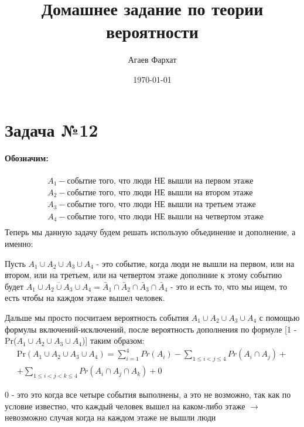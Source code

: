 \documentclass[a4paper, 12pt]{article} %
\author{Агаев Фархат}
\title{Домашнее задание по теории вероятности}
\date{\today}
\begin{document}

\maketitle

\section*{Задача №12}

\paragraph{Обозначим:}
\begin{align}
    &A_{1} - \text{событие того, что люди НЕ вышли на первом этаже}\\
    &A_{2} - \text{событие того, что люди НЕ вышли на втором этаже}\\
    &A_{3} - \text{событие того, что люди НЕ вышли на третьем этаже}\\
    &A_{4} - \text{событие того, что люди НЕ вышли на четвертом этаже}\\ 
\end{align}
Теперь мы данную задачу будем решать использую объединение и дополнение, а именно:

Пусть $A_{1} \cup A_{2} \cup A_{3} \cup A_{4}$ - это событие,
 когда люди не вышли на первом, 
или на втором, или на третьем,
 или на четвертом этаже дополнние к этому событию будет
  $\overline{A_{1} \cup A_{2} \cup A_{3} \cup A_{4}}
  = \bar A_{1} \cap \bar A_{2} \cap \bar A_{3} \cap \bar A_{4}$ - это и есть
  то, что мы ищем, то есть чтобы на каждом этаже вышел человек.

  Дальше мы просто посчитаем вероятность события $A_{1} \cup A_{2} \cup A_{3} \cup A_{4}$ 
  с помощью формулы включений-исключений, после вероятность дополнения
  по формуле [1 - Pr($A_{1} \cup A_{2} \cup A_{3} \cup A_{4}$)] таким образом:
  \begin{align}
    \text{Pr} (A_{1} \cup A_{2} \cup A_{3} \cup A_{4}) = \sum\limits_{i=1}^4 Pr(A_{i})
    - \sum\limits_{1 \leq i < j \leq 4} Pr(A_{i} \cap A_{j}) + \\
    + \sum\limits_{1 \leq i < j < k \leq 4} Pr(A_{i} \cap A_{j} \cap A_{k}) + 0 
\end{align}
    
0 - это это когда все четыре события выполнены, а это не возможно, так как  по условие известно,
что каждый человек вышел на каком-либо этаже $\rightarrow$ невозможно случая когда на каждом этаже не вышли люди
\end{document}
